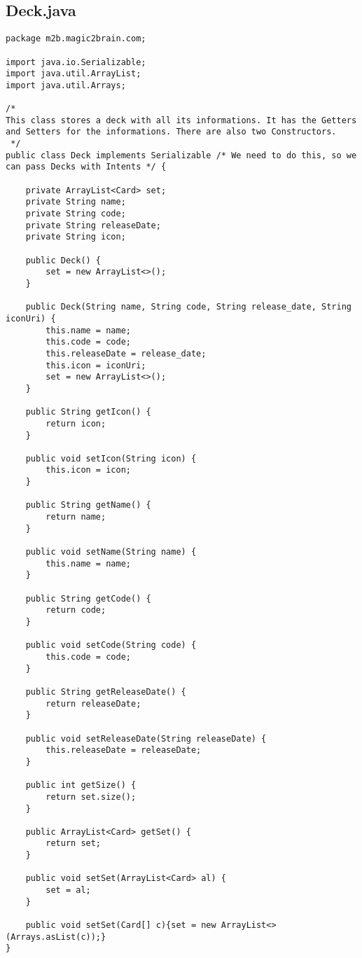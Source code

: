 \subsection{Deck.java}
\begin{lstlisting}
package m2b.magic2brain.com;

import java.io.Serializable;
import java.util.ArrayList;
import java.util.Arrays;

/*
This class stores a deck with all its informations. It has the Getters and Setters for the informations. There are also two Constructors.
 */
public class Deck implements Serializable /* We need to do this, so we can pass Decks with Intents */ {

    private ArrayList<Card> set;
    private String name;
    private String code;
    private String releaseDate;
    private String icon;

    public Deck() {
        set = new ArrayList<>();
    }

    public Deck(String name, String code, String release_date, String iconUri) {
        this.name = name;
        this.code = code;
        this.releaseDate = release_date;
        this.icon = iconUri;
        set = new ArrayList<>();
    }

    public String getIcon() {
        return icon;
    }

    public void setIcon(String icon) {
        this.icon = icon;
    }

    public String getName() {
        return name;
    }

    public void setName(String name) {
        this.name = name;
    }

    public String getCode() {
        return code;
    }

    public void setCode(String code) {
        this.code = code;
    }

    public String getReleaseDate() {
        return releaseDate;
    }

    public void setReleaseDate(String releaseDate) {
        this.releaseDate = releaseDate;
    }

    public int getSize() {
        return set.size();
    }

    public ArrayList<Card> getSet() {
        return set;
    }

    public void setSet(ArrayList<Card> al) {
        set = al;
    }

    public void setSet(Card[] c){set = new ArrayList<>(Arrays.asList(c));}
}
\end{lstlisting}
\newpage

